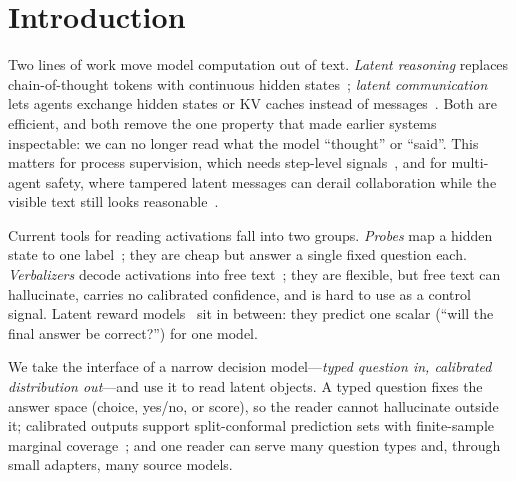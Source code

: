 \section{Introduction}
\label{sec:intro}

Two lines of work move model computation out of text. \emph{Latent reasoning} replaces chain-of-thought tokens with continuous hidden states~\cite{hao2024coconut,shen2025codi,geiping2025huginn}; \emph{latent communication} lets agents exchange hidden states or KV caches instead of messages~\cite{latentmas,c2c}. Both are efficient, and both remove the one property that made earlier systems inspectable: we can no longer read what the model ``thought'' or ``said''. This matters for process supervision, which needs step-level signals~\cite{wang2024mathshepherd,lightman2024verify}, and for multi-agent safety, where tampered latent messages can derail collaboration while the visible text still looks reasonable~\cite{latentlie}.

Current tools for reading activations fall into two groups. \emph{Probes} map a hidden state to one label~\cite{alain2016probes}; they are cheap but answer a single fixed question each. \emph{Verbalizers} decode activations into free text~\cite{ghandeharioun2024patchscopes,chen2024selfie,pan2024latentqa}; they are flexible, but free text can hallucinate, carries no calibrated confidence, and is hard to use as a control signal. Latent reward models~\cite{lto} sit in between: they predict one scalar (``will the final answer be correct?'') for one model.

We take the interface of a narrow decision model---\emph{typed question in, calibrated distribution out}---and use it to read latent objects. A typed question fixes the answer space (choice, yes/no, or score), so the reader cannot hallucinate outside it; calibrated outputs support split-conformal prediction sets with finite-sample marginal coverage~\cite{vovk2005alrw,angelopoulos2021gentle}; and one reader can serve many question types and, through small adapters, many source models.


